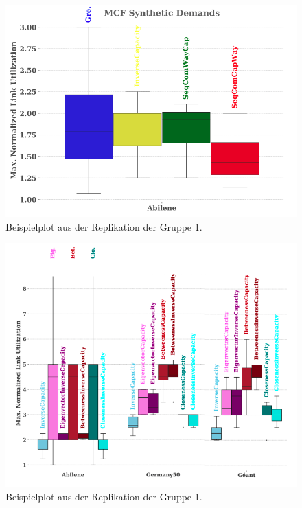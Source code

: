 \documentclass[sigconf, nonacm, review]{acmart}
\begin{document}
\begin{figure}
\centering
\includegraphics[width=\linewidth]{figures/p.png}
\caption{Beispielplot aus der Replikation der Gruppe 1.}
\label{fi}
\end{figure}

\begin{figure}
\centering
\includegraphics[width=\linewidth]{figures/k.png}
\caption{Beispielplot aus der Replikation der Gruppe 1.}
\label{fi1}
\end{figure}
\end{document}
